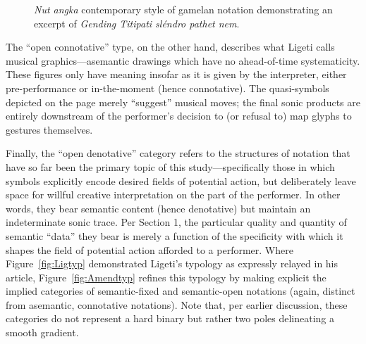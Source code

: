     \begin{figure}
        \centering
        \captionsetup{width=.5\textwidth}
        \caption[\textit{Nut angka} contemporary style of gamelan notation demonstrating an excerpt of \textit{Gending Titipati sléndro pathet nem}.]{\textit{Nut angka} contemporary style of gamelan notation demonstrating an excerpt of \textit{Gending Titipati sléndro pathet nem}.\footnotemark}
        \label{fig:gamelannot}
    \end{figure}

    The ``open connotative'' type, on the other hand, describes what Ligeti calls musical graphics---asemantic drawings which have no ahead-of-time systematicity. These figures only have meaning insofar as it is given by the interpreter, either pre-performance or in-the-moment (hence connotative). The quasi-symbols depicted on the page merely ``suggest'' musical moves; the final sonic products are entirely downstream of the performer's decision to (or refusal to) map glyphs to gestures themselves.
    
    
    Finally, the ``open denotative'' category refers to the structures of notation that have so far been the primary topic of this study---specifically those in which symbols explicitly encode desired fields of potential action, but deliberately leave space for willful creative interpretation on the part of the performer. In other words, they bear semantic content (hence denotative) but maintain an indeterminate sonic trace. Per Section 1, the particular quality and quantity of semantic ``data'' they bear is merely a function of the specificity with which it shapes the field of potential action afforded to a performer. Where Figure~\ref{fig:Ligtyp} demonstrated Ligeti's typology as expressly relayed in his article, Figure~\ref{fig:Amendtyp} refines this typology by making explicit the implied categories of semantic-fixed and semantic-open notations (again, distinct from asemantic, connotative notations). Note that, per earlier discussion, these categories do not represent a hard binary but rather two poles delineating a smooth gradient.

